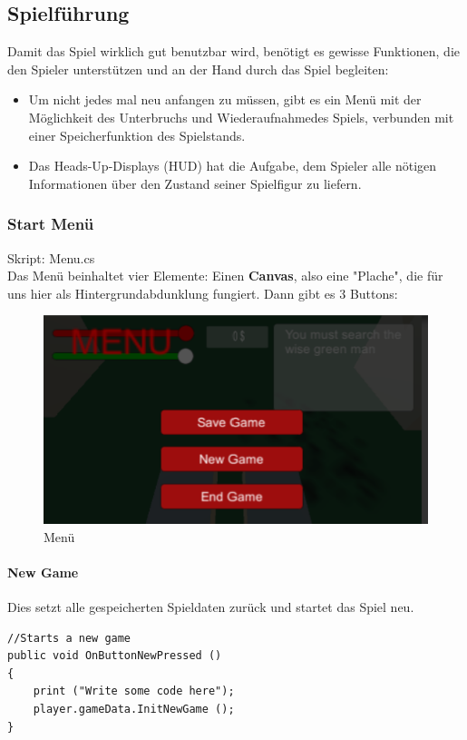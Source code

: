 \subsection{Spielführung}
Damit das Spiel wirklich gut benutzbar wird, benötigt es gewisse Funktionen, die den Spieler unterstützen und an der Hand durch das Spiel begleiten:
\begin{itemize}
\item Um nicht jedes mal neu anfangen zu müssen, gibt es ein Menü mit der Möglichkeit des Unterbruchs und Wiederaufnahmedes Spiels, verbunden mit einer Speicherfunktion des Spielstands.
\item Das Heads-Up-Displays (HUD) hat die Aufgabe, dem Spieler alle nötigen Informationen über den Zustand seiner Spielfigur zu liefern.
\end{itemize}



\subsubsection{Start Menü}
Skript: Menu.cs\\
Das Menü beinhaltet vier Elemente: Einen \textbf{Canvas}, also eine "Plache", die für uns hier als Hintergrundabdunklung fungiert. Dann gibt es 3 Buttons:

\begin{figure}[H]
\includegraphics[scale=1]{screenshots/menuscreen.png}
\caption{Menü}
\end{figure}


\paragraph{New Game}
Dies setzt alle gespeicherten Spieldaten zurück und startet das Spiel neu.

\begin{lstlisting}[caption={New Game}]
//Starts a new game
public void OnButtonNewPressed ()
{
	print ("Write some code here");
	player.gameData.InitNewGame ();
}

\end{lstlisting}

